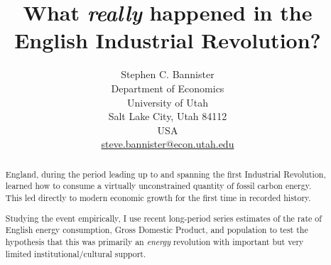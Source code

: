 \documentclass[final]{beamer}
\title{What \textit{really} happened in the English Industrial Revolution?} %
\author{Stephen C. Bannister\\
	Department of Economics\\
	University of Utah\\
	Salt Lake City, Utah 84112\\
	USA\\
	\href{mailto:steve.bannister@econ.utah.edu}{steve.bannister@econ.utah.edu}\\
	}
\date{}
\begin{document}

	\maketitle
	\nocite{*}
%	

	
%	

\begin{frame}
	\begin{abstract}
	
	England, during the period leading up to and spanning the first Industrial Revolution, learned how to consume a virtually unconstrained quantity of fossil carbon energy. This led directly to modern economic growth for the first time in recorded history. 
	
	
	
	Studying the event empirically, I use recent long-period series estimates of the rate of English energy consumption, Gross Domestic Product, and population to test the hypothesis that this was primarily an \textit{energy} revolution with important but very limited institutional/cultural support.
	

\end{abstract}
\end{frame}
\end{document}
